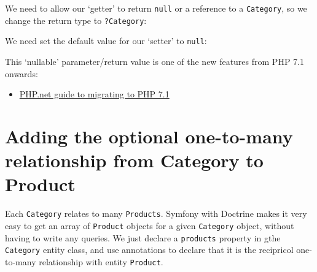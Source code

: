 \documentclass[a4paperpaper,openright]{book}
\newenvironment{Shaded}{}{}
\newcommand{\CommentTok}[1]{\textcolor[rgb]{0.38,0.63,0.69}{\textit{#1}}}
\newcommand{\KeywordTok}[1]{\textcolor[rgb]{0.00,0.44,0.13}{\textbf{#1}}}
\newcommand{\NormalTok}[1]{#1}
\newcommand{\OtherTok}[1]{\textcolor[rgb]{0.00,0.44,0.13}{#1}}
\providecommand{\tightlist}{%
  \setlength{\itemsep}{0pt}\setlength{\parskip}{0pt}}
\begin{document}
We need to allow our `getter' to return \texttt{null} or a reference to
a \texttt{Category}, so we change the return type to \texttt{?Category}:

\begin{Shaded}
\end{Shaded}

We need set the default value for our `setter' to \texttt{null}:

\begin{Shaded}
\end{Shaded}

This `nullable' parameter/return value is one of the new features from
PHP 7.1 onwards:

\begin{itemize}
\tightlist
\item
  \href{http://php.net/manual/en/migration71.new-features.php}{PHP.net
  guide to migrating to PHP 7.1}
\end{itemize}

\hypertarget{adding-the-optional-one-to-many-relationship-from-category-to-product}{%
\section{Adding the optional one-to-many relationship from Category to
Product}\label{adding-the-optional-one-to-many-relationship-from-category-to-product}}

Each \texttt{Category} relates to many \texttt{Products}. Symfony with
Doctrine makes it very easy to get an array of \texttt{Product} objects
for a given \texttt{Category} object, without having to write any
queries. We just declare a \texttt{products} property in gthe
\texttt{Category} entity class, and use annotations to declare that it
is the recipricol one-to-many relationship with entity \texttt{Product}.
\end{document}
